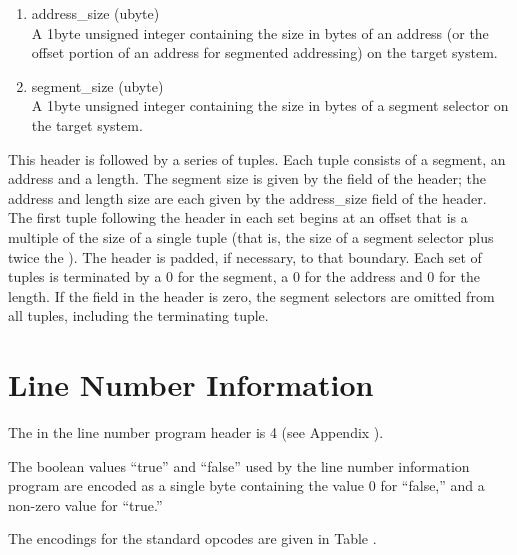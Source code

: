 \begin{enumerate}[1. ]
\item address\_size (ubyte) \\
A 1\dash byte unsigned integer containing the size in bytes of an
address 
(or the offset portion of an address for segmented
addressing) on the target system.

\item segment\_size (ubyte) \\
A 
1\dash byte unsigned integer containing the size in bytes of a
segment selector on the target system.

\end{enumerate}

This header is followed by a series of tuples. Each tuple
consists of a segment, an address and a length. 
The segment
size is given by the  field of the header; the
address and length size are each given by the address\_size
field of the header. 
The first tuple following the header in
each set begins at an offset that is a multiple of the size
of a single tuple (that is, the size of a segment selector
plus twice the ). 
The header is padded, if
necessary, to that boundary. Each set of tuples is terminated
by a 0 for the segment, a 0 for the address and 0 for the
length. If the  field in the header is zero,
the segment selectors are omitted from all tuples, including
the terminating tuple.


\section{Line Number Information}
\label{datarep:linenumberinformation}

The 
in the line number program header is 4
(see Appendix ). 

The boolean values ``true'' and ``false'' 
used by the line number information program are encoded
as a single byte containing the value 0 
for ``false,'' and a non-zero value for ``true.''

The encodings for the standard opcodes are given in 
Table .


